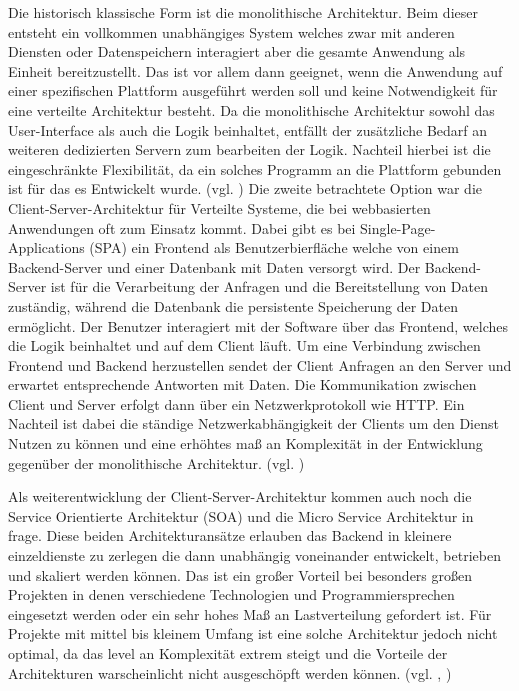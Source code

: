 Die historisch klassische Form ist die monolithische Architektur. Beim dieser entsteht ein vollkommen unabhängiges System welches zwar mit anderen Diensten oder Datenspeichern interagiert aber die gesamte Anwendung als Einheit bereitzustellt. Das ist vor allem dann geeignet, wenn die Anwendung auf einer spezifischen Plattform ausgeführt werden soll und keine Notwendigkeit für eine verteilte Architektur besteht. Da die monolithische Architektur sowohl das User-Interface als auch die Logik beinhaltet, entfällt der zusätzliche Bedarf an weiteren dedizierten Servern zum bearbeiten der Logik. Nachteil hierbei ist die eingeschränkte Flexibilität, da ein solches Programm an die Plattform gebunden ist für das es Entwickelt wurde. (vgl. \cite{Architekturen})
Die zweite betrachtete Option war die Client-Server-Architektur für Verteilte Systeme, die bei webbasierten Anwendungen oft zum Einsatz kommt. Dabei gibt es \zB bei Single-Page-Applications (SPA) ein Frontend als Benutzerbierfläche welche von einem Backend-Server und einer Datenbank mit Daten versorgt wird. Der Backend-Server ist für die Verarbeitung der Anfragen und die Bereitstellung von Daten zuständig, während die Datenbank die persistente Speicherung der Daten ermöglicht. Der Benutzer interagiert mit der Software über das Frontend, welches die Logik beinhaltet und auf dem Client läuft. Um eine Verbindung zwischen Frontend und Backend herzustellen sendet der Client Anfragen an den Server und erwartet entsprechende Antworten mit Daten. Die Kommunikation zwischen Client und Server erfolgt dann über ein Netzwerkprotokoll wie HTTP. Ein Nachteil ist dabei die ständige Netzwerkabhängigkeit der Clients um den Dienst Nutzen zu können und eine erhöhtes maß an Komplexität in der Entwicklung gegenüber der monolithische Architektur. (vgl. \cite{SPA})

Als weiterentwicklung der Client-Server-Architektur kommen auch noch die Service Orientierte Architektur (SOA) und die Micro Service Architektur in frage. Diese beiden Architekturansätze erlauben das Backend in kleinere einzeldienste zu zerlegen die dann unabhängig voneinander entwickelt, betrieben und skaliert werden können. Das ist ein großer Vorteil bei besonders großen Projekten in denen verschiedene Technologien und Programmiersprechen eingesetzt werden oder ein sehr hohes Maß an Lastverteilung gefordert ist. Für Projekte mit mittel bis kleinem Umfang ist eine solche Architektur jedoch nicht optimal, da das level an Komplexität extrem steigt und die Vorteile der Architekturen warscheinlicht nicht ausgeschöpft werden können. (vgl. \cite{SOA}, \cite{Micro})

